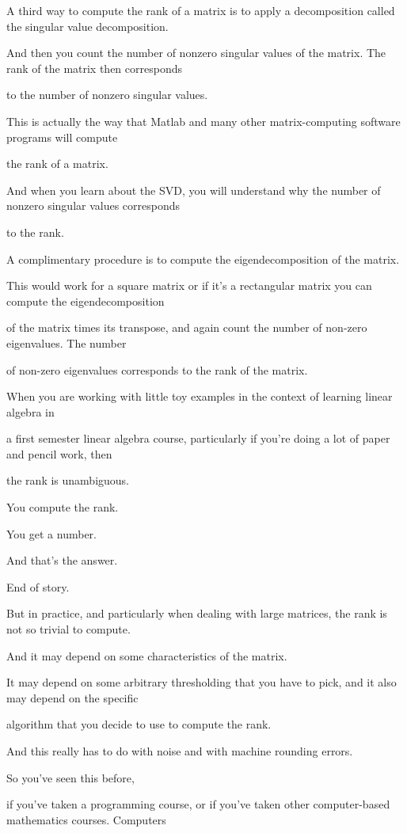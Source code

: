 \documentclass[fleqn,10pt]{olplainarticle}
\theoremstyle{definition}
\theoremstyle{remark}
\begin{document}
A third way to compute the rank of a matrix is to apply a decomposition called the singular value decomposition.

And then you count the number of nonzero singular values of the matrix. The rank of the matrix then corresponds

to the number of nonzero singular values.

This is actually the way that Matlab and many other matrix-computing software programs will compute

the rank of a matrix.

And when you learn about the SVD, you will understand why the number of nonzero singular values corresponds

to the rank.

A complimentary procedure is to compute the eigendecomposition of the matrix.

This would work for a square matrix or if it's a rectangular matrix you can compute the eigendecomposition

of the matrix times its transpose, and again count the number of non-zero eigenvalues. The number

of non-zero eigenvalues corresponds to the rank of the matrix.

When you are working with little toy examples in the context of learning linear algebra in

a first semester linear algebra course, particularly if you're doing a lot of paper and pencil work, then

the rank is unambiguous.

You compute the rank.

You get a number.

And that's the answer.

End of story.

But in practice, and particularly when dealing with large matrices, the rank is not so trivial to compute.

And it may depend on some characteristics of the matrix.

It may depend on some arbitrary thresholding that you have to pick, and it also may depend on the specific

algorithm that you decide to use to compute the rank.

And this really has to do with noise and with machine rounding errors.

So you've seen this before,

if you've taken a programming course, or if you've taken other computer-based mathematics courses. Computers
\end{document}
